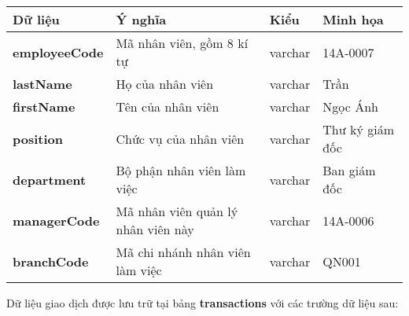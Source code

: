 \begin{center}
    \begin{tabular}{ | m{9em} | m{15em}| m{5em} | m{5em} | } 
    \hline
    \rowcolor{gray!30}
    Dữ liệu & Ý nghĩa & Kiểu & Minh họa \\ 

    \hline
    \textbf{employeeCode} &
    Mã nhân viên, gồm 8 kí tự &
    varchar &
    14A-0007 \\

    \hline
    \textbf{lastName} &
    Họ của nhân viên &
    varchar &
    Trần \\

    \hline
    \textbf{firstName} &
    Tên của nhân viên &
    varchar &
    Ngọc Ánh \\

    \hline
    \textbf{position} &
    Chức vụ của nhân viên &
    varchar &
    Thư ký giám đốc \\

    \hline
    \textbf{department} &
    Bộ phận nhân viên làm việc &
    varchar &
    Ban giám đốc \\

    \hline
    \textbf{managerCode} &
    Mã nhân viên quản lý nhân viên này &
    varchar &
    14A-0006 \\

    \hline
    \textbf{branchCode} &
    Mã chi nhánh nhân viên làm việc &
    varchar &
    QN001 \\
    
    \hline
    \end{tabular}
\end{center}

\noindent
Dữ liệu giao dịch được lưu trữ tại bảng \textbf{transactions} với các trường dữ liệu sau:

\renewcommand{\arraystretch}{2} %
\setlength{\tabcolsep}{10pt}

